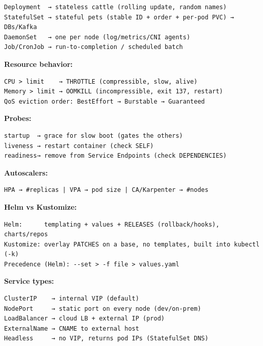 \documentclass[11pt]{article}
\begin{document}
\setcodelang{}

\begin{verbatim}
Deployment  → stateless cattle (rolling update, random names)
StatefulSet → stateful pets (stable ID + order + per-pod PVC) → DBs/Kafka
DaemonSet   → one per node (log/metrics/CNI agents)
Job/CronJob → run-to-completion / scheduled batch
\end{verbatim}

\textbf{Resource behavior:}

\setcodelang{}

\begin{verbatim}
CPU > limit    → THROTTLE (compressible, slow, alive)
Memory > limit → OOMKILL (incompressible, exit 137, restart)
QoS eviction order: BestEffort → Burstable → Guaranteed
\end{verbatim}

\textbf{Probes:}

\setcodelang{}

\begin{verbatim}
startup  → grace for slow boot (gates the others)
liveness → restart container (check SELF)
readiness→ remove from Service Endpoints (check DEPENDENCIES)
\end{verbatim}

\textbf{Autoscalers:}

\setcodelang{}

\begin{verbatim}
HPA → #replicas | VPA → pod size | CA/Karpenter → #nodes
\end{verbatim}

\textbf{Helm vs Kustomize:}

\setcodelang{}

\begin{verbatim}
Helm:      templating + values + RELEASES (rollback/hooks), charts/repos
Kustomize: overlay PATCHES on a base, no templates, built into kubectl (-k)
Precedence (Helm): --set > -f file > values.yaml
\end{verbatim}

\textbf{Service types:}

\setcodelang{}

\begin{verbatim}
ClusterIP    → internal VIP (default)
NodePort     → static port on every node (dev/on-prem)
LoadBalancer → cloud LB + external IP (prod)
ExternalName → CNAME to external host
Headless     → no VIP, returns pod IPs (StatefulSet DNS)
\end{verbatim}
\end{document}
